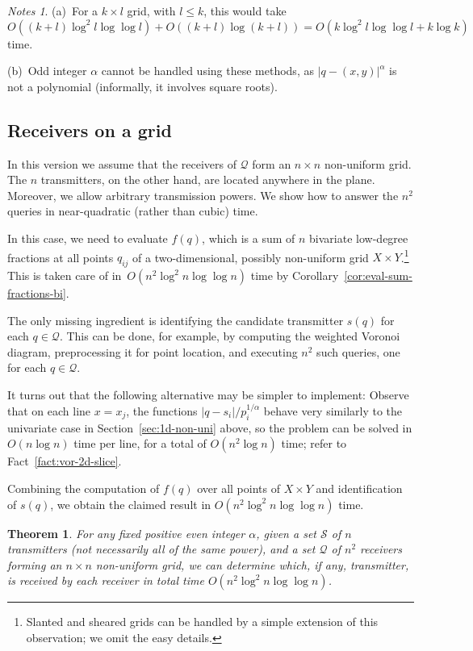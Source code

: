 \documentclass[11pt]{article}
\newtheorem{theorem}{Theorem}[section]
\theoremstyle{remark}
\newtheorem*{notes}{Notes}
\def\Q{\mathcal{Q}}
\def\S{\mathcal{S}}
\begin{document}
\begin{notes}
  (a)~For a $k\times l$ grid, with $l \leq k$, this would take $O((k+l) \log^2 l \log \log
  l) + O((k+l)\log (k+l)) = O(k\log^2 l \log \log l + k \log k)$ time.

  (b)~Odd integer $\alpha$ cannot be handled using these methods, as $|q-(x,y)|^\alpha$ is not a polynomial (informally, it involves square roots).
\end{notes}

\subsection{Receivers on a grid}
\label{sec:rec-grid}
In this version we assume that the receivers of $\Q$ form an $n \times n$ non-uniform grid.
The $n$ transmitters, on the other hand, are located anywhere in the plane. Moreover, we allow arbitrary transmission powers.
We show how to answer the $n^2$ queries in near-quadratic (rather than  cubic) time.

In this case, we need to evaluate $f(q)$, which is a sum of $n$
bivariate low-degree fractions at all points $q_{ij}$ of a
two-dimensional, possibly non-uniform grid $X \times
Y$.\footnote{Slanted and sheared grids can be handled by a simple
  extension of this observation; we omit the easy details.}
This is taken care of in~$O(n^2 \log^2 n \log \log n)$ time by
Corollary~\ref{cor:eval-sum-fractions-bi}.

The only missing ingredient is identifying the candidate transmitter
$s(q)$ for each $q \in \Q$.  This can be done, for example,
by computing the weighted Voronoi diagram, preprocessing it for point
location, and executing $n^2$ such queries, one for each $q \in \Q$.  

It turns out that the following alternative may be 
simpler to implement: Observe that on each line $x=x_j$, the
functions $|q-s_i|/p_i^{1/\alpha}$ behave very similarly to the
univariate case in Section~\ref{sec:1d-non-uni} above, so the problem
can be solved in $O(n \log n)$ time per line, for a total of $O(n^2
\log n)$ time; refer to Fact~\ref{fact:vor-2d-slice}.


Combining the computation of $f(q)$ over all points of $X \times Y$
and identification of $s(q)$, we obtain the claimed result in
$O(n^2 \log^2 n \log \log n)$ time.

\begin{theorem}
  \label{th:2d-receivers-on-grid}
  For any fixed positive even integer $\alpha$, given a set $\S$ of $n$
  transmitters (not necessarily all of the same power), and a set $\Q$ of $n^2$ receivers forming an $n \times n$ non-uniform grid, we can determine
  which, if any, transmitter, is received by each receiver in total time $O(n^2 \log^2 n \log \log n)$.
\end{theorem}
\end{document}
